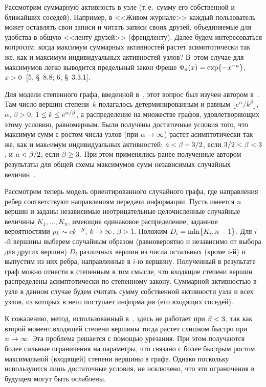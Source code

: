 \begin{multicols}{2}
    Рассмотрим суммарную активность в узле (т.\,е.\ сумму его собственной и
    ближайших соседей). Например, в <<Живом журнале>>
    каждый пользователь может оставлять свои записи и читать записи
    своих друзей, объединяемые для удобства в общую <<ленту друзей>> (френдленту).
    Далее будем интересоваться вопросом: когда максимум суммарных активностей
    растет асимптотически так же, как и максимум индивидуальных
    активностей узлов? В~этом случае для максимумов легко выводится
    предельный закон Фреше
    $\Phi_a(x)\hm=\exp\{-x^{-a}\}$, $x\hm>0$~[5, \S\ 8.8; 6, \S~3.3.1].

    Для модели степенного графа, введенной в~\cite{Pow},
    этот вопрос был изучен автором в~\cite{Leb2}.
    Там число вершин степени~$k$ полагалось
    детерминированным и равным $\lfloor e^\alpha/k^\beta\rfloor$,
    $\alpha$, $\beta>0$, $1\hm\le k\hm\le e^{\alpha/\beta}$,
    а распределение на множестве графов,
    удовле\-тво\-ря\-ющих этому условию, равномерным.
    Были получены достаточные условия того,
    что максимум сумм с ростом числа узлов (при $\alpha\hm\to\infty$)
    растет асимптотически так же, как и макcимум
    индивидуальных активностей: $a\hm<\beta\hm-3/2$, если $3/2\hm<\beta\hm<3$, и
    $a\hm<\beta/2$, если $\beta\hm\ge 3$. При этом применялись
    ранее полученные автором результаты для
    общей схемы максимумов сумм независимых случайных величин~\cite{Leb1}.

    Рассмотрим теперь модель ориентированного
    случайного графа, где направления ребер соответствуют направлениям
    передачи информации. Пусть имеется $n$ вершин и заданы независимые
    неотрицательные целочисленные случайные величины $K_1,\dots, K_n$,
    имеющие одинаковое
    распределение, заданное вероятностями $p_k\hm\sim ck^{-\beta}$, $k\hm\to\infty$,
    $\beta>1$. Положим $D_i\hm=\min\{K_i,n-1\}$. Для $i$-й вершины выберем
    случайным образом (равновероятно и независимо от выбора для других
    вершин) $D_i$ различных вершин из числа остальных (кроме $i$-й) и
    выпустим из них ребра, направленные в \mbox{$i$-ю} вершину. Полученный в
    результате граф можно отнести к степенным в том смысле, что входящие
    степени вершин распределены асимптотически по степенному закону.
    Суммарной активностью в узле в данном случае будем считать сумму
    собственной активности узла и всех узлов, из которых в него
    поступает информация (его входящих соседей).

    К сожалению, метод, использованный в~\cite{Leb2}, здесь
    не работает при $\beta\hm<3$, так как второй момент
    входящей степени вершины тогда растет слишком быстро при $n\hm\to\infty$.
    Эта проблема решается с по\-мощью урезания.
    При этом получаются более сильные ограничения на
    параметры, что связано с более быст\-рым ростом максимальной (входящей)
    степени вершины в графе. Однако поскольку используются лишь
    достаточные условия, не исключено, что эти ограничения в
    будущем могут быть ослаблены.


\end{multicols}
